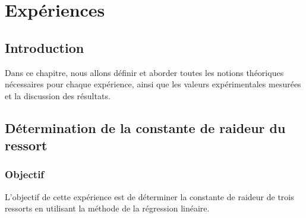 \section{Expériences}
    \subsection{Introduction}
    Dans ce chapitre, nous allons définir et aborder toutes les notions théoriques nécessaires
    pour chaque expérience, ainsi que les valeurs expérimentales mesurées et la discussion des résultats.

    \subsection{Détermination de la constante de raideur du ressort}
        \subsubsection{Objectif}
            L'objectif de cette expérience est de déterminer la constante de raideur de trois ressorts
            en utilisant la méthode de la régression linéaire.
